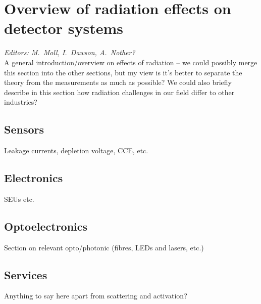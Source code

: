 \section{Overview of radiation effects on detector systems}
\label{sec:effects}
{\it Editors: M.~Moll, I.~Dawson, A.~Nother?}  \\

\noindent
A general introduction/overview on effects of radiation -- we could possibly merge this section into the other sections, but my view is it's better to separate the theory from the measurements as much as possible? We could also briefly describe in this section how radiation challenges in our field differ to other industries?

\subsection{Sensors}
Leakage currents, depletion voltage, CCE, etc.

\subsection{Electronics}
SEUs etc.

\subsection{Optoelectronics}
Section on relevant opto/photonic (fibres, LEDs and lasers, etc.)

\subsection{Services}
Anything to say here apart from scattering and activation?


\begin{thebibliography}{99}
\end{thebibliography}
